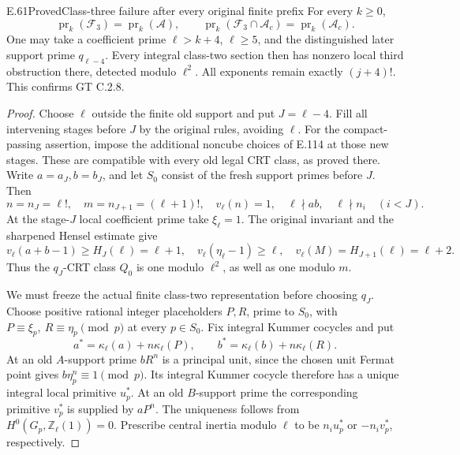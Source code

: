 \begin{result}{E.61}{Proved}{Class-three failure after every original finite prefix}
\label{coh:exact-dense-three}
For every $k\geq0$,
\[
 \operatorname{pr}_k(\mathscr F_3)
     =\operatorname{pr}_k(\mathscr A),\qquad
 \operatorname{pr}_k(\mathscr F_3\cap\mathscr A_c)
     =\operatorname{pr}_k(\mathscr A_c).
\]
One may take a coefficient prime $\ell>k+4$,
$\ell\geq5$, and the distinguished later support
prime $q_{\ell-4}$. Every integral class-two
section then has nonzero local third obstruction
there, detected modulo $\ell^2$. All exponents
remain exactly $(j+4)!$. This confirms GT C.2.8.
\end{result}
\begin{proof}
Choose $\ell$ outside the finite old support and put
$J=\ell-4$. Fill all intervening stages before
$J$ by the original rules, avoiding $\ell$.
For the compact-passing assertion, impose the
additional noncube choices of E.114 at those
new stages. These are compatible with every
old legal CRT class, as proved there.
Write $a=a_J,b=b_J$, and let $S_0$ consist of
the fresh support primes before $J$.
Then
\[
 n=n_J=\ell!,\quad m=n_{J+1}=(\ell+1)!,
 \quad v_\ell(n)=1,\quad \ell\nmid ab,\quad
 \ell\nmid n_i\quad(i<J).
 \tag{E.61.1}
\]
At the stage-$J$ local coefficient prime take
$\xi_\ell=1$. The original invariant and the
sharpened Hensel estimate give
\[
 v_\ell(a+b-1)\geq H_J(\ell)=\ell+1,\quad
 v_\ell(\eta_\ell-1)\geq\ell,\quad
 v_\ell(M)=H_{J+1}(\ell)=\ell+2.
 \tag{E.61.2}
\]
Thus the $q_J$-CRT class $Q_0$ is one modulo
$\ell^2$, as well as one modulo $m$.

We must freeze the actual finite class-two
representation before choosing $q_J$. Choose
positive rational integer placeholders $P,R$,
prime to $S_0$, with
$P\equiv\xi_p,\ R\equiv\eta_p\pmod p$
at every $p\in S_0$. Fix integral Kummer cocycles
and put
\[
 a^*=\kappa_\ell(a)+n\kappa_\ell(P),\qquad
 b^*=\kappa_\ell(b)+n\kappa_\ell(R).
\]
At an old $A$-support prime $bR^n$ is a
principal unit, since the chosen unit Fermat
point gives $b\eta_p^n\equiv1\pmod p$.
Its integral Kummer cocycle therefore has
a unique integral local primitive $u_p^*$.
At an old $B$-support prime the corresponding
primitive $v_p^*$ is supplied by $aP^n$.
The uniqueness follows from
$H^0(G_p,\mathbb Z_\ell(1))=0$.
Prescribe central inertia modulo $\ell$ to be
$n_i u_p^*$ or $-n_i v_p^*$, respectively.


\end{proof}
